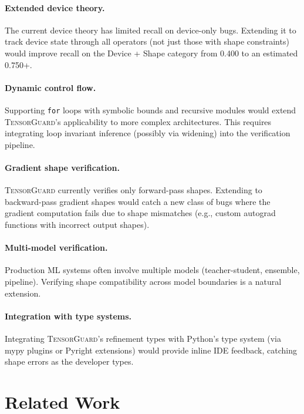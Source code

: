 \documentclass[10pt]{article}
\newcommand{\tguard}{\textsc{TensorGuard}}
\theoremstyle{plain}
\theoremstyle{definition}
\theoremstyle{remark}
\begin{document}
\paragraph{Extended device theory.}
The current device theory has limited recall on device-only bugs.
Extending it to track device state through all operators (not just
those with shape constraints) would improve recall on the Device +
Shape category from 0.400 to an estimated 0.750+.

\paragraph{Dynamic control flow.}
Supporting \texttt{for} loops with symbolic bounds and recursive
modules would extend \tguard{}'s applicability to more complex
architectures.  This requires integrating loop invariant inference
(possibly via widening) into the verification pipeline.

\paragraph{Gradient shape verification.}
\tguard{} currently verifies only forward-pass shapes.  Extending
to backward-pass gradient shapes would catch a new class of bugs
where the gradient computation fails due to shape mismatches
(e.g., custom autograd functions with incorrect output shapes).

\paragraph{Multi-model verification.}
Production ML systems often involve multiple models (teacher-student,
ensemble, pipeline).  Verifying shape compatibility across model
boundaries is a natural extension.

\paragraph{Integration with type systems.}
Integrating \tguard{}'s refinement types with Python's type system
(via mypy plugins or Pyright extensions) would provide inline IDE
feedback, catching shape errors as the developer types.


\section{Related Work}\label{sec:related}
\end{document}
